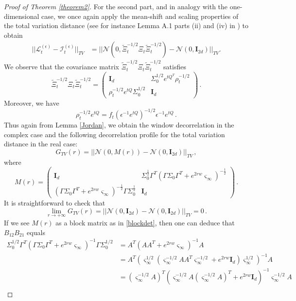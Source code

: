 \documentclass[12pt,thmsa]{article}
\begin{document}
\begin{proof}[Proof of Theorem \ref{theorem2}]
	
	For the second part, and in analogy with the one-dimensional case,   we once again apply the mean-shift and scaling properties  of the total variation distance (see for instance Lemma A.1 parts (ii) and (iv) in \cite{BJ1})  to obtain
	\[
	\begin{split}
		||\mathcal{L}^{(\epsilon)}_{t}-\mathcal{I}^{(\epsilon)}_{t}||_{TV}&=|| \mathcal{N}(0, \widetilde{\Xi}_t^{-1/2}\Xi_t\widetilde{\Xi}_t^{-1/2})-\mathcal{N}(0, \mathbf{I}_{2d})||_{TV}.
	\end{split}
	\]
	We observe that the covariance matrix $\widetilde{\Xi}_t^{-1/2}\Xi_t\widetilde{\Xi}_t^{-1/2}$ satisfies
	$$\widetilde{\Xi}_t^{-1/2}\Xi_t\widetilde{\Xi}_t^{-1/2}=\begin{pmatrix}\mathbf{I}_{d} & \Sigma^{1/2}_0e^{ tQ^T}\rho_t^{-1/2} \\ \rho_t^{-1/2} e^{tQ}\Sigma_0^{1/2} & \mathbf{I}_{d} \end{pmatrix}\,.$$
	Moreover, we have
	$$ \rho_t^{-1/2} e^{tQ}=f_t\left(\epsilon^{-1}e^{tQ} \right)^{-1/2}\epsilon^{-1}e^{tQ} \,.$$
	Thus again from Lemma \ref{Jordan}, we obtain the window decorrelation in the complex case and the following decorrelation profile for the total variation distance in the real case:
	$$G_{TV}(r)= || \mathcal{N}(0, M(r))-\mathcal{N}(0, \mathbf{I}_{2d})||_{TV}\,,$$
	where 
	\[	 
	M(r)=\begin{pmatrix}
		\mathbf{I}_d &  \Sigma_0^{\frac{1}{2}} \Gamma^T  ( \Gamma \Sigma_0 \Gamma^T + e^{2r w} \varsigma_{\infty} )^{-\frac{1}{2}} 
		\\ ( \Gamma \Sigma_0 \Gamma^T + e^{2rw} \varsigma_{\infty} )^{-\frac{1}{2}} \Gamma \Sigma_0^{\frac{1}{2}} & \mathbf{I}_d  \end{pmatrix}\,.
	\]
	It is straightforward to check that 
	$$\lim_{r\to+\infty}G_{TV}(r)= || \mathcal{N}(0, \mathbf{I}_{2d})-\mathcal{N}(0, \mathbf{I}_{2d})||_{TV}=0\,.$$
	If we see $M(r)$ as a block matrix as in \eqref{blockdet}, then one can deduce that $B_{12}B_{21}$ equals
	\[
	\begin{split}
		\Sigma_0^{1/2}\Gamma^T\left(\Gamma\Sigma_0\Gamma^T+ e^{2rw}\varsigma_{\infty} \right)^{-1} \Gamma\Sigma_0^{1/2}&=A^T\left(AA^T+ e^{2rw}\varsigma_{\infty} \right)^{-1}A\\
		&=A^T\left(\varsigma_{\infty}^{1/2}\left(\varsigma_{\infty}^{-1/2}AA^T\varsigma_{\infty}^{-1/2}+ e^{2rw}\mathbf{I}_d\right)\varsigma_{\infty}^{1/2} \right)^{-1}A\\
		&=(\varsigma_{\infty}^{-1/2}A)^T\left(\varsigma_{\infty}^{-1/2}A(\varsigma_{\infty}^{-1/2}A)^T+ e^{2rw}\mathbf{I}_d\right)^{-1}\varsigma_{\infty}^{-1/2} A\\

\end{split}\]
\end{proof}
\end{document}
